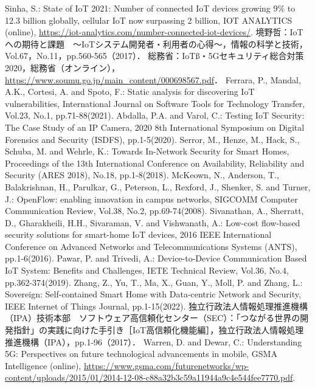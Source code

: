 \documentclass[a4paper,10pt,twocolumn,uplatex]{jsarticle}
\begin{document}
\footnotesize{
  \begin{thebibliography}{99}
     Sinha, S.: State of IoT 2021: Number of connected IoT devices growing 9\% to 12.3 billion globally, cellular IoT now surpassing 2 billion, IOT ANALYTICS (online),
    \url{https://iot-analytics.com/number-connected-iot-devices/}.
     境野哲：IoTへの期待と課題　～IoTシステム開発者・利用者の心得～，情報の科学と技術，Vol.67，No.11，pp.560-565（2017）．
     総務省：IoTß・5Gセキュリティ総合対策2020，総務省（オンライン），
    \url{https://www.soumu.go.jp/main_content/000698567.pdf}．
     Ferrara, P., Mandal, A.K., Cortesi, A. and Spoto, F.: Static analysis for discovering IoT vulnerabilities, International Journal on Software Tools for Technology Transfer, Vol.23, No.1, pp.71-88(2021).
     Abdalla, P.A. and Varol, C.: Testing IoT Security: The Case Study of an IP Camera, 2020 8th International Symposium on Digital Forensics and Security (ISDFS), pp.1-5(2020).
     Serror, M., Henze, M., Hack, S., Schuba, M. and Wehrle, K.: Towards In-Network Security for Smart Homes, Proceedings of the 13th International Conference on Availability, Reliability and Security (ARES 2018), No.18, pp.1-8(2018).
     McKeown, N., Anderson, T., Balakrishnan, H., Parulkar, G., Peterson, L., Rexford, J., Shenker, S. and Turner, J.: OpenFlow: enabling innovation in campus networks, SIGCOMM Computer Communication Review, Vol.38, No.2, pp.69-74(2008).
     Sivanathan, A., Sherratt, D., Gharakheili, H.H., Sivaraman, V. and Vishwanath, A.: Low-cost flow-based security solutions for smart-home IoT devices, 2016 IEEE International Conference on Advanced Networks and Telecommunications Systems (ANTS), pp.1-6(2016).
     Pawar, P. and Trivedi, A.: Device-to-Device Communication Based IoT System: Benefits and Challenges, IETE Technical Review, Vol.36, No.4, pp.362-374(2019).
     Zhang, Z., Yu, T., Ma, X., Guan, Y., Moll, P. and Zhang, L.: Sovereign: Self-contained Smart Home with Data-centric Network and Security, IEEE Internet of Things Journal, pp.1-15(2022).
     独立行政法人情報処理推進機構（IPA）技術本部　ソフトウェア高信頼化センター（SEC）：「つながる世界の開発指針」の実践に向けた手引き［IoT高信頼化機能編］，独立行政法人情報処理推進機構（IPA），pp.1-96（2017）．
     Warren, D. and Dewar, C.: Understanding 5G: Perspectives on future technological advancements in mobile, GSMA Intelligence (online),
    \url{https://www.gsma.com/futurenetworks/wp-content/uploads/2015/01/2014-12-08-c88a32b3c59a11944a9c4e544fee7770.pdf}.
  \end{thebibliography}
}

% 
% 

\end{document}
